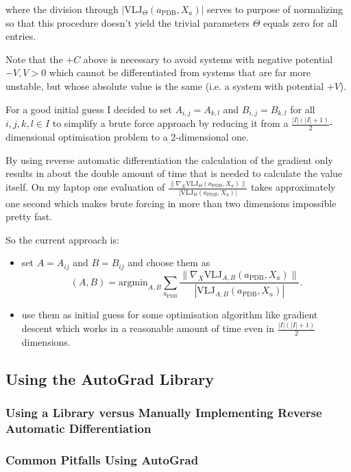 where the division through $| \text{VLJ}_\Theta(a_\text{PDB},X_a) |$ serves to purpose of normalizing so that this procedure doesn't yield the trivial parameters $\Theta$ equals zero for all entries.

Note that the $+C$ above is necessary to avoid systems with negative potential $-V, V>0$ which cannot be differentiated from systems that are far more unstable, but whose absolute value is the same (i.e. a system with potential $+V$).

For a good initial guess I decided to set $A_{i,j} = A_{k,l}$ and $B_{i,j} = B_{k,l}$ for all $i,j,k,l \in I$ to simplify a brute force approach by reducing it from a $\frac{|I|(|I|+1)}{2}$-dimensional optimisation problem to a 2-dimensional one.

By using reverse automatic differentiation the calculation of the gradient only results in about the double amount of time that is needed to calculate the value itself. On my laptop one evaluation of $\frac{\| \nabla_X \text{VLJ}_\Theta(a_\text{PDB},X_a) \|}{| \text{VLJ}_\Theta(a_\text{PDB},X_a)|}$ takes approximately one second which makes brute forcing in more than two dimensions impossible pretty fast.

So the current approach is:

\begin{itemize}
	\item set $A = A_{ij}$ and $B = B_{ij}$ and choose them as $$(A,B) = \text{argmin}_{A,B} \sum_{a_\text{PDB}} \frac{\| \nabla_X \text{VLJ}_{A,B}(a_\text{PDB},X_a) \|}{| \text{VLJ}_{A,B}(a_\text{PDB},X_a) |}.$$
	\item use them as initial guess for some optimisation algorithm like gradient descent which works in a reasonable amount of time even in $\frac{|I|(|I|+1)}{2}$ dimensions.
\end{itemize}

\subsection{Using the AutoGrad Library}
\subsubsection{Using a Library versus Manually Implementing Reverse Automatic Differentiation}

\subsubsection{Common Pitfalls Using AutoGrad}



